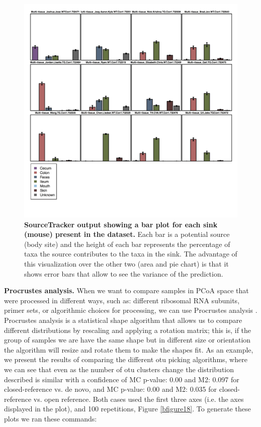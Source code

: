 \begin{figure}[htbp]
\includegraphics[width=\columnwidth]{chapter_book_figures/Figure_17.jpg}
\caption[SourceTracker output showing a bar plot for each sink (mouse) present in the dataset]{\textbf{SourceTracker output showing a bar plot for each sink (mouse) present in the dataset.}
Each bar is a potential source (body site) and the height of each bar represents the percentage of
taxa the source contributes to the taxa in the sink. The advantage of this visualization over the other
two (area and pie chart) is that it shows error bars that allow to see the variance of the prediction.}
\label{bfigure17}
\end{figure}

\textbf{Procrustes analysis.} When we want to compare samples in PCoA space that
were processed in different ways, such as: different ribosomal RNA subunits, primer sets,
or algorithmic choices for processing, we can use Procrustes analysis \cite{Gower1966, Muegge2011, Vinten2011}.
Procrustes analysis is a statistical shape algorithm that allows us to compare different distributions by
rescaling and applying a rotation matrix; this is, if the group of samples we are have the same shape but
in different size or orientation the algorithm will resize and rotate them to make the shapes fit. As an example,
we present the results of comparing the different \gls{otu} picking algorithms, where we can see that even as the number
of \gls{otu} clusters change the distribution described is similar with a confidence of MC p-value: 0.00 and M2: 0.097 for
closed-reference vs. de novo, and MC p-value: 0.00 and M2: 0.035 for closed-reference vs. open reference.
Both cases used the first three axes (i.e. the axes displayed in the plot), and 100 repetitions, Figure \ref{bfigure18}.
To generate these plots we ran these commands:

